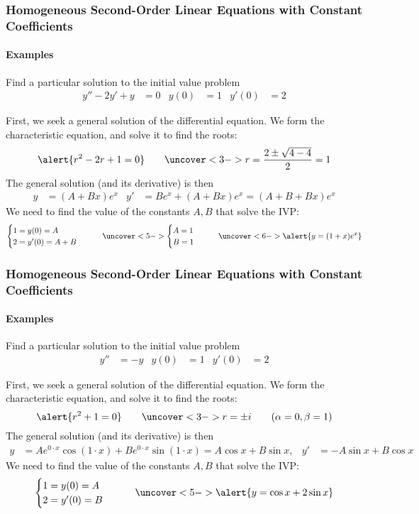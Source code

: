 \documentclass[9pt,xcolor=x11names,compress]{beamer}
\begin{document}
\begin{frame}\frametitle{Homogeneous Second-Order Linear Equations with Constant Coefficients}
\framesubtitle{Examples}
\begin{block}
	{Find a particular solution to the initial value problem}
	\begin{align*}
		y''-2y'+y&=0 &y(0)&=1 &y'(0)&=2
	\end{align*}
\end{block}
\pause First, we seek a general solution of the differential equation.  We form the characteristic equation, and solve it to find the roots:
\begin{equation*}
	\alert{r^2-2r+1=0}\qquad 
	\uncover<3->{r=\frac{2\pm \sqrt{4-4}}{2}=1}
\end{equation*}
\pause The general solution (and its derivative) is then 
\begin{align*}
	y&=(A+Bx)e^x & y'&=Be^x+(A+Bx)e^x=(A+B+Bx)e^x
\end{align*}
\pause We need to find the value of the constants $A,B$ that solve the IVP:
\begin{equation*}
\begin{cases}
	1=y(0)=A \\ 2=y'(0)=A+B
\end{cases}\qquad
\uncover<5->{\begin{cases}
	A=1 \\B=1
\end{cases}\qquad}
\uncover<6->{\alert{y=(1+x)e^x}}
\end{equation*}
\end{frame}

\begin{frame}\frametitle{Homogeneous Second-Order Linear Equations with Constant Coefficients}
\framesubtitle{Examples}
\begin{block}
	{Find a particular solution to the initial value problem}
	\begin{align*}
		y''&=-y &y(0)&=1 &y'(0)&=2
	\end{align*}
\end{block}
\pause First, we seek a general solution of the differential equation.  We form the characteristic equation, and solve it to find the roots:
\begin{equation*}
	\alert{r^2+1=0}\qquad 
	\uncover<3->{r=\pm i\qquad (\alpha=0, \beta=1)}
\end{equation*}
\pause The general solution (and its derivative) is then 
\begin{align*}
	y&=Ae^{0\cdot x}\cos(1\cdot x)+ Be^{0\cdot x}\sin(1\cdot x)=A\cos x + B\sin x, & y'&=-A\sin x + B\cos x
\end{align*}
\pause We need to find the value of the constants $A,B$ that solve the IVP:
\begin{equation*}
\begin{cases}
	1=y(0)=A \\ 2=y'(0)=B
\end{cases}\qquad
\uncover<5->{\alert{y=\cos x + 2\sin x}}
\end{equation*}
\end{frame}
\end{document}
